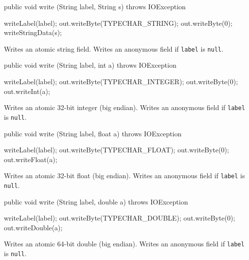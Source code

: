 \begin{code}
   public void write (String label, String s) throws IOException \begin{hide} {
      writeLabel(label);
      out.writeByte(TYPECHAR_STRING);
      out.writeByte(0);
      writeStringData(s);
   }
   \end{hide}
\end{code}
\begin{tabb}
Writes an atomic string field.
Writes an anonymous field if \texttt{label} is \texttt{null}.
\end{tabb}
\begin{code}

   public void write (String label, int a) throws IOException \begin{hide} {
      writeLabel(label);
      out.writeByte(TYPECHAR_INTEGER);
      out.writeByte(0);
      out.writeInt(a);
   }
   \end{hide}
\end{code}
\begin{tabb}
Writes an atomic 32-bit integer (big endian).
Writes an anonymous field if \texttt{label} is \texttt{null}.
\end{tabb}
\begin{code}

   public void write (String label, float a) throws IOException \begin{hide} {
      writeLabel(label);
      out.writeByte(TYPECHAR_FLOAT);
      out.writeByte(0);
      out.writeFloat(a);
   }
   \end{hide}
\end{code}
\begin{tabb}
Writes an atomic 32-bit float  (big endian).
Writes an anonymous field if \texttt{label} is \texttt{null}.
\end{tabb}
\begin{code}

   public void write (String label, double a) throws IOException \begin{hide} {
      writeLabel(label);
      out.writeByte(TYPECHAR_DOUBLE);
      out.writeByte(0);
      out.writeDouble(a);
   }
   \end{hide}
\end{code}
\begin{tabb}
Writes an atomic 64-bit double (big endian).
Writes an anonymous field if \texttt{label} is \texttt{null}.
\end{tabb}


